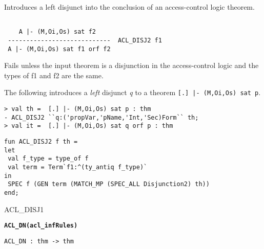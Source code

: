 \SYNOPSIS
Introduces a left disjunct into the conclusion of an access-control
logic theorem.

\DESCRIBE
\begin{verbatim}

    A |- (M,Oi,Os) sat f2
 ----------------------------  ACL_DISJ2 f1
 A |- (M,Oi,Os) sat f1 orf f2
\end{verbatim}


\FAILURE
Fails unless the input theorem is a disjunction in the
access-control logic and the types of f1 and f2 are the same.

\EXAMPLE
The following introduces a \emph{left} disjunct \emph{q} to
a theorem \texttt{[.] |- (M,Oi,Os) sat p}.
\begin{holboxed}
\begin{verbatim}
> val th =  [.] |- (M,Oi,Os) sat p : thm
- ACL_DISJ2 ``q:('propVar,'pName,'Int,'Sec)Form`` th;
> val it =  [.] |- (M,Oi,Os) sat q orf p : thm
\end{verbatim}
\end{holboxed}

\IMPLEMENTATION
\begin{holboxed}
\begin{verbatim}
fun ACL_DISJ2 f th = 
let
 val f_type = type_of f
 val term = Term`f1:^(ty_antiq f_type)`
in
 SPEC f (GEN term (MATCH_MP (SPEC_ALL Disjunction2) th))
end;
\end{verbatim}
\end{holboxed}

\SEEALSO
ACL\_DISJ1
\ENDDOC
 

\begin{holboxed}
  \begin{Large}
    \textbf{\texttt{ACL\_DN}}\hfill{}\textbf{\texttt{(acl\_infRules)}}
  \end{Large}
\end{holboxed}
\begin{verbatim}
ACL_DN : thm -> thm
\end{verbatim}

